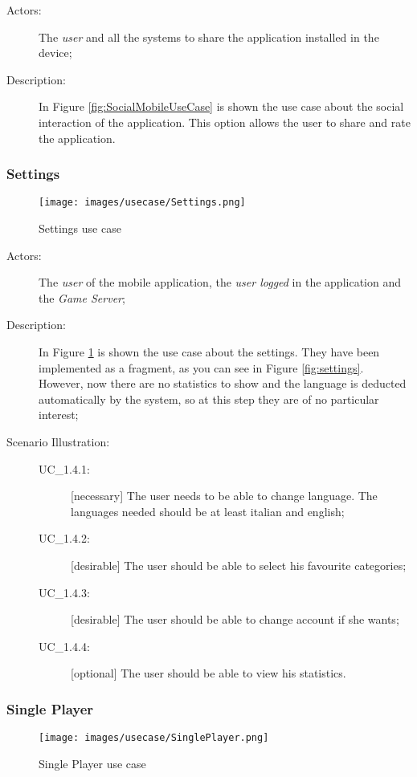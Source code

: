 \begin{description}
	\item[Actors:] The \textit{user} and all the systems to share the application installed in the device;
	\item[Description:] In Figure \ref{fig:SocialMobileUseCase} is shown the use case about the social interaction of the application. This option allows the user to share and rate the application.
\end{description}

\subsubsection{Settings}
\label{sec:settings}
\begin{figure}[H]
\centering %
\texttt{[image: images/usecase/Settings.png]}
\caption{Settings use case}
\label{fig:SettingsUseCase}
\end{figure}

\begin{description}
	\item[Actors:] The \textit{user} of the mobile application, the \textit{user logged} in the application and the \textit{Game Server};
	\item[Description:] In Figure \ref{fig:SettingsUseCase} is shown the use case about the settings. They have been implemented as a fragment, as you can see in Figure \ref{fig:settings}. However, now there are no statistics to show and the language is deducted automatically by the system, so at this step they are of no particular interest;
	\item[Scenario Illustration:]
	
		\begin{description}
			\item[UC\_1.4.1:] [necessary] The user needs to be able to change language. The languages needed should be at least italian and english;
			\item[UC\_1.4.2:] [desirable] The user should be able to select his favourite categories;
			\item[UC\_1.4.3:] [desirable] The user should be able to change account if she wants;
			\item[UC\_1.4.4:] [optional] The user should be able to view his statistics.
		\end{description}
\end{description}

\subsubsection{Single Player}
\label{sec:singlePlayer}
\begin{figure}[H]
\centering %
\texttt{[image: images/usecase/SinglePlayer.png]}
\caption{Single Player use case}
\label{fig:SinglePlayerUseCase}
\end{figure}

